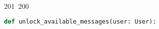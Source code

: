201~200~\documentclass{article}
\begin{document}
	                                                                                                                                                                                                                                                                                                	                                                                                                                                        	    	                                                                                                	                                                                                                                        \begin{lstlisting}[language=Python, caption=Unlock messages]
	                                                                                                                                                                                                                                                                                                	                                                                                                                                        	    	                                                                                                	                                                                                                                        def unlock_available_messages(user: User):
	                                                                                                                                                                                                                                                                                                	                                                                                                                                        	    	                                                                                                	                                                                                                                            """
	                                                                                                                                                                                                                                                                                                	                                                                                                                                        	    	                                                                                                	                                                                                                                                \brief Unlock available messages for a user.

\end{lstlisting}
\end{document}
